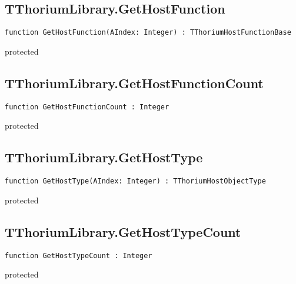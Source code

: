 \subsection{TThoriumLibrary.GetHostFunction}
\label{thoriumcore:thorium:tthoriumlibrary:gethostfunction}
\begin{FPCList}
\Synopsis
\Declaration 

\begin{verbatim}
function GetHostFunction(AIndex: Integer) : TThoriumHostFunctionBase
\end{verbatim}
\Visibility
protected
\Description
\Errors
\end{FPCList}
\subsection{TThoriumLibrary.GetHostFunctionCount}
\label{thoriumcore:thorium:tthoriumlibrary:gethostfunctioncount}
\begin{FPCList}
\Synopsis
\Declaration 

\begin{verbatim}
function GetHostFunctionCount : Integer
\end{verbatim}
\Visibility
protected
\Description
\Errors
\end{FPCList}
\subsection{TThoriumLibrary.GetHostType}
\label{thoriumcore:thorium:tthoriumlibrary:gethosttype}
\begin{FPCList}
\Synopsis
\Declaration 

\begin{verbatim}
function GetHostType(AIndex: Integer) : TThoriumHostObjectType
\end{verbatim}
\Visibility
protected
\Description
\Errors
\end{FPCList}
\subsection{TThoriumLibrary.GetHostTypeCount}
\label{thoriumcore:thorium:tthoriumlibrary:gethosttypecount}
\begin{FPCList}
\Synopsis
\Declaration 

\begin{verbatim}
function GetHostTypeCount : Integer
\end{verbatim}
\Visibility
protected
\Description
\Errors
\end{FPCList}
